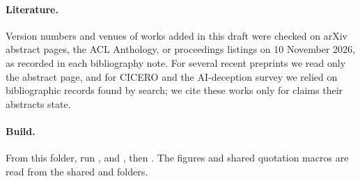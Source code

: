 \paragraph{Literature.} Version numbers and venues of works added in this draft were checked on arXiv abstract pages, the ACL Anthology, or proceedings listings on 10 November 2026, as recorded in each bibliography note. For several recent preprints we read only the abstract page, and for CICERO and the AI-deception survey we relied on bibliographic records found by search; we cite these works only for claims their abstracts state.

\paragraph{Build.} From this folder, run ,  and , then . The figures and shared quotation macros are read from the shared  and  folders.
